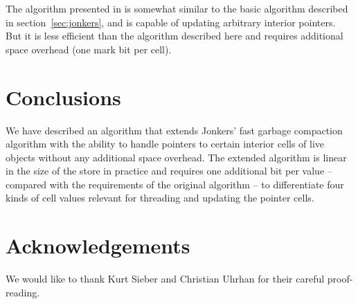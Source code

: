 \documentclass[10pt,a4paper,final,twocolumn]{article}
\begin{document}
The algorithm presented in \cite{Morris78} is somewhat similar to the basic algorithm described
in section~\ref{sec:jonkers}, and is capable of updating arbitrary interior pointers. But it is
less efficient than the algorithm described here and requires additional space overhead (one
mark bit per cell).


\section{Conclusions}
\label{sec:conclusion}


We have described an algorithm that extends Jonkers' fast garbage compaction algorithm
with the ability to handle pointers to certain interior cells of live objects without any additional
space overhead. The extended algorithm is linear in the size of the store in practice 
and requires one additional bit per value -- compared with the requirements of the
original algorithm -- to differentiate four kinds of cell values relevant for threading and
updating the pointer cells.


\section*{Acknowledgements}

We would like to thank Kurt Sieber and Christian Uhrhan for their careful proof-reading.




\end{document}
